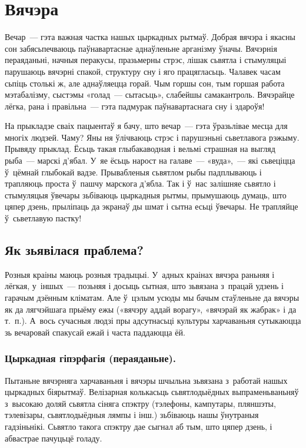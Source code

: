 \chapter{Вячэра}

Вечар~--- гэта важная частка нашых цыркадных рытмаў. Добрая вячэра і якасны сон забясьпечваюць паўнавартаснае аднаўленьне арганізму ўначы. Вячэрнія пераяданьні, начныя перакусы, празьмерны стрэс, лішак сьвятла і стымуляцыі парушаюць вячэрні спакой, структуру сну і яго працягласьць. Чалавек часам сьпіць столькі ж, але аднаўляецца горай. Чым горшы сон, тым горшая работа мэтабалізму, сыстэмы «голад~--- сытасьць», слабейшы самакантроль. Вячэрайце лёгка, рана і правільна~--- гэта падмурак паўнавартаснага сну і здароўя!

На прыкладзе сваіх пацыентаў я бачу, што вечар~--- гэта ўразьлівае месца для многіх людзей. Чаму? Яны ня ўлічваюць стрэс і парушэньні сьветлавога рэжыму. Прывяду прыклад. Ёсьць такая глыбакаводная і вельмі страшная на выгляд рыба~--- марскі д'ябал. У~яе ёсьць нарост на галаве~--- «вуда»,~--- які сьвеціцца ў~цёмнай глыбокай вадзе. Прывабленыя сьвятлом рыбы падплываюць і трапляюць проста ў~пашчу марскога д'ябла. Так і ў~нас залішняе сьвятло і стымуляцыя ўвечары зьбіваюць цыркадныя рытмы, прымушаюць думаць, што цяпер дзень, прыліпаць да экранаў ды шмат і сытна есьці ўвечары. Не трапляйце ў~сьветлавую пастку!

\section{Як зьявілася праблема?}

Розныя краіны маюць розныя традыцыі. У~адных краінах вячэра раньняя і лёгкая, у~іншых~--- позьняя і досыць сытная, што зьвязана з~працай удзень і гарачым дзённым кліматам. Але ў~цэлым усюды мы бачым стаўленьне да вячэры як да лягчэйшага прыёму ежы («вячэру аддай ворагу», «вячэрай як жабрак» і да т.~п.). А~вось сучасныя людзі пры адсутнасьці культуры харчаваньня сутыкаюцца зь вечаровай спакусай ежай і часта паддаюцца ёй.


\subsection{Цыркадная гіпэрфагія (пераяданьне).}
Пытаньне вячэрняга харчаваньня і вячэры шчыльна зьвязана з~работай нашых цыркадных біярытмаў. Велізарная колькасьць сьвятлодыёдных выпраменьваньняў з~высокаю доляй сьвятла сіняга спэктру (тэлефоны, кампутары, пляншэты, тэлевізары, сьвятлодыёдныя лямпы і інш.) зьбіваюць нашы ўнутраныя гадзіньнікі. Сьвятло такога спэктру дае сыгнал аб тым, што цяпер дзень, і абвастрае пачуцьцё голаду.

